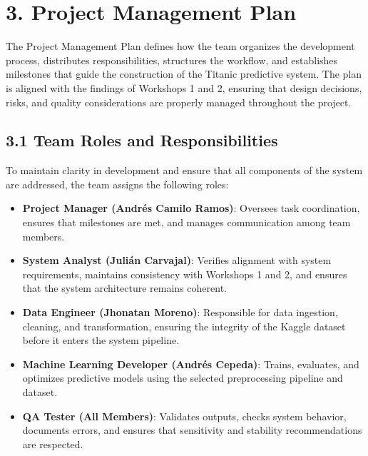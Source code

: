 \documentclass[12pt]{report}
\begin{document}
\section*{3. Project Management Plan}

The Project Management Plan defines how the team organizes the development process, distributes responsibilities, structures the workflow, and establishes milestones that guide the construction of the Titanic predictive system. The plan is aligned with the findings of Workshops 1 and 2, ensuring that design decisions, risks, and quality considerations are properly managed throughout the project.

\subsection*{3.1 Team Roles and Responsibilities}

To maintain clarity in development and ensure that all components of the system are addressed, the team assigns the following roles:

\begin{itemize}
    \item \textbf{Project Manager (Andrés Camilo Ramos)}: Oversees task coordination, ensures that milestones are met, and manages communication among team members.
    
    \item \textbf{System Analyst (Julián Carvajal)}: Verifies alignment with system requirements, maintains consistency with Workshops 1 and 2, and ensures that the system architecture remains coherent.
    
    \item \textbf{Data Engineer (Jhonatan Moreno)}: Responsible for data ingestion, cleaning, and transformation, ensuring the integrity of the Kaggle dataset before it enters the system pipeline.
    
    \item \textbf{Machine Learning Developer (Andrés Cepeda)}: Trains, evaluates, and optimizes predictive models using the selected preprocessing pipeline and dataset.
    
    \item \textbf{QA Tester (All Members)}: Validates outputs, checks system behavior, documents errors, and ensures that sensitivity and stability recommendations are respected.
\end{itemize}
\end{document}
